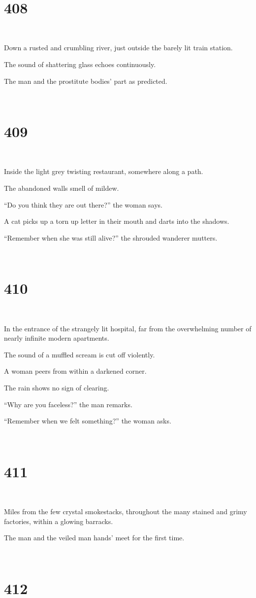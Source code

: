\documentclass{report}
\begin{document}
~
\chapter*{408}
~

Down a rusted and crumbling river, just outside the barely lit train station.

The sound of shattering glass echoes continuously.

The man and the prostitute bodies' part as predicted.

~
\chapter*{409}
~

Inside the light grey twisting restaurant, somewhere along a path.

The abandoned walls smell of mildew.

``Do you think they are out there?'' the woman says.

A cat picks up a torn up letter in their mouth and darts into the shadows.

``Remember when she was still alive?'' the shrouded wanderer mutters.

~
\chapter*{410}
~

In the entrance of the strangely lit hospital, far from the overwhelming number of nearly infinite modern apartments.

The sound of a muffled scream is cut off violently.

A woman peers from within a darkened corner.

The rain shows no sign of clearing.

``Why are you faceless?'' the man remarks.

``Remember when we felt something?'' the woman asks.

~
\chapter*{411}
~

Miles from the few crystal smokestacks, throughout the many stained and grimy factories, within a glowing barracks.

The man and the veiled man hands' meet for the first time.

~
\chapter*{412}
~
\end{document}
